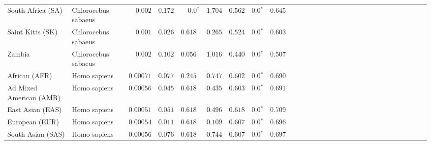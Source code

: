 \begin{center}
\begin{adjustbox}{width = 1\textwidth}
\begin{tabular}{|l|l|r|r|r|r|r|r|r|r|r|r|r|r|r|r|r|r|r|r|r|r|r|r|r|r|r|r|r|}
              South Africa (SA) &  Chlorocebus sabaeus &           $ 0.002$ &                      $ 0.172$ &                  $\bm{0.0{^*}}$ &                                           $ 1.704$ &                      $ 0.562$ &                  $\bm{0.0{^*}}$ &                                           $ 0.645$ \\
               Saint Kitts (SK) &  Chlorocebus sabaeus &           $ 0.001$ &                      $ 0.026$ &                      $ 0.618~~$ &                                           $ 0.265$ &                      $ 0.524$ &                  $\bm{0.0{^*}}$ &                                           $ 0.603$ \\
                         Zambia &  Chlorocebus sabaeus &           $ 0.002$ &                      $ 0.102$ &                      $ 0.056~~$ &                                           $ 1.016$ &                      $ 0.440$ &                  $\bm{0.0{^*}}$ &                                           $ 0.507$ \\
                  African (AFR) &         Homo sapiens &          $0.00071$ &                      $ 0.077$ &                      $ 0.245~~$ &                                           $ 0.747$ &                      $ 0.602$ &                  $\bm{0.0{^*}}$ &                                           $ 0.690$ \\
        Ad Mixed American (AMR) &         Homo sapiens &          $0.00056$ &                      $ 0.045$ &                      $ 0.618~~$ &                                           $ 0.435$ &                      $ 0.603$ &                  $\bm{0.0{^*}}$ &                                           $ 0.691$ \\
               East Asian (EAS) &         Homo sapiens &          $0.00051$ &                      $ 0.051$ &                      $ 0.618~~$ &                                           $ 0.496$ &                      $ 0.618$ &                  $\bm{0.0{^*}}$ &                                           $ 0.709$ \\
                 European (EUR) &         Homo sapiens &          $0.00054$ &                      $ 0.011$ &                      $ 0.618~~$ &                                           $ 0.109$ &                      $ 0.607$ &                  $\bm{0.0{^*}}$ &                                           $ 0.696$ \\
              South Asian (SAS) &         Homo sapiens &          $0.00056$ &                      $ 0.076$ &                      $ 0.618~~$ &                                           $ 0.744$ &                      $ 0.607$ &                  $\bm{0.0{^*}}$ &                                           $ 0.697$ \\
\bottomrule
\end{tabular}
\end{adjustbox}
\end{center}
\newpage
